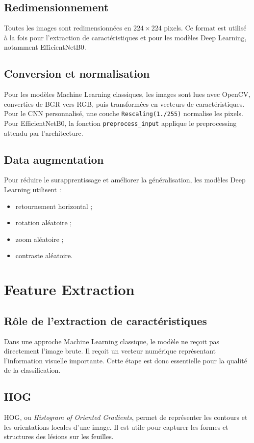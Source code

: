 \documentclass[12pt,a4paper]{report}
\begin{document}
\section{Redimensionnement}
Toutes les images sont redimensionnées en $224 \times 224$ pixels. Ce format est utilisé à la fois pour l'extraction de caractéristiques et pour les modèles Deep Learning, notamment EfficientNetB0.

\section{Conversion et normalisation}
Pour les modèles Machine Learning classiques, les images sont lues avec OpenCV, converties de BGR vers RGB, puis transformées en vecteurs de caractéristiques. Pour le CNN personnalisé, une couche \texttt{Rescaling(1./255)} normalise les pixels. Pour EfficientNetB0, la fonction \texttt{preprocess\_input} applique le preprocessing attendu par l'architecture.

\section{Data augmentation}
Pour réduire le surapprentissage et améliorer la généralisation, les modèles Deep Learning utilisent :
\begin{itemize}
  \item retournement horizontal ;
  \item rotation aléatoire ;
  \item zoom aléatoire ;
  \item contraste aléatoire.
\end{itemize}

\chapter{Feature Extraction}

\section{Rôle de l'extraction de caractéristiques}
Dans une approche Machine Learning classique, le modèle ne reçoit pas directement l'image brute. Il reçoit un vecteur numérique représentant l'information visuelle importante. Cette étape est donc essentielle pour la qualité de la classification.

\section{HOG}
HOG, ou \textit{Histogram of Oriented Gradients}, permet de représenter les contours et les orientations locales d'une image. Il est utile pour capturer les formes et structures des lésions sur les feuilles.
\end{document}
